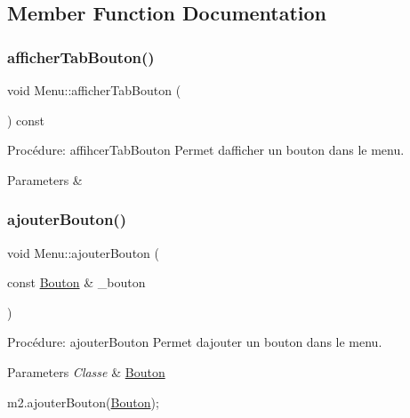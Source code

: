 \subsection{Member Function Documentation}
\mbox{\label{classMenu_abf73624171efcb0b3605dffbf6fdd43e}} 
\subsubsection{\texorpdfstring{afficher\+Tab\+Bouton()}{afficherTabBouton()}}
{\footnotesize\ttfamily void Menu\+::afficher\+Tab\+Bouton (\begin{DoxyParamCaption}{ }\end{DoxyParamCaption}) const}



Procédure\+: affihcer\+Tab\+Bouton Permet d\textquotesingle{}afficher\textquotesingle{} un bouton dans le menu. 


\begin{DoxyParams}{Parameters}
{\em } & \\
\hline
\end{DoxyParams}
\mbox{\label{classMenu_a6f14df82f9e51a4fe61fefef62e31062}} 
\subsubsection{\texorpdfstring{ajouter\+Bouton()}{ajouterBouton()}}
{\footnotesize\ttfamily void Menu\+::ajouter\+Bouton (\begin{DoxyParamCaption}\item[{const \hyperlink{classBouton}{Bouton} \&}]{\+\_\+bouton }\end{DoxyParamCaption})}



Procédure\+: ajouter\+Bouton Permet d\textquotesingle{}ajouter un bouton dans le menu. 


\begin{DoxyParams}{Parameters}
{\em Classe} & \hyperlink{classBouton}{Bouton} 
\begin{DoxyCode}
m2.ajouterBouton(\hyperlink{classBouton}{Bouton});
\end{DoxyCode}
 \\
\hline
\end{DoxyParams}
\mbox{\label{classMenu_a892dd884c5e7675f8cfd9c59c3247f96}} 
